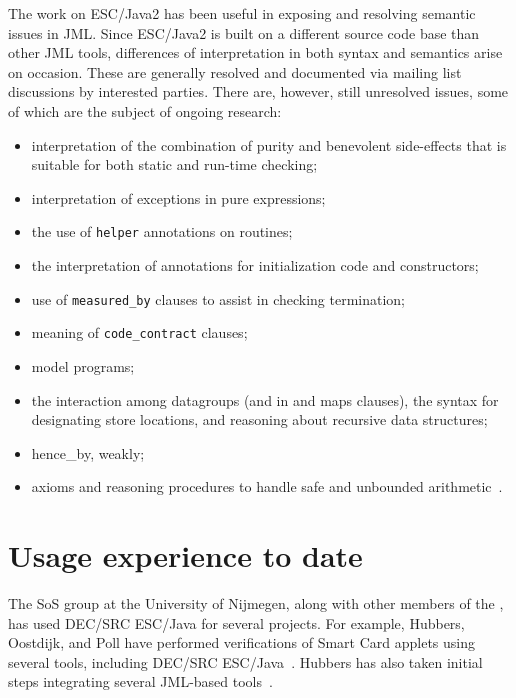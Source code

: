 \documentclass{acm_proc_article-sp}
\begin{document}
The work on ESC/Java2 has been useful in exposing and resolving
semantic issues in JML.  Since ESC/Java2 is built on a different
source code base than other JML tools, differences of interpretation
in both syntax and semantics arise on occasion.  These are generally
resolved and documented via mailing list discussions by interested
parties.  There are, however, still unresolved issues, some of which
are the subject of ongoing research:
\setlength{\partopsep}{0in}\setlength{\parskip}{0in}\setlength{\itemsep}{0in}\setlength{\topsep}{0in}
\begin{itemize}
\setlength{\partopsep}{0in}\setlength{\parskip}{0in}\setlength{\itemsep}{0in}\setlength{\topsep}{0in}
\item interpretation of the combination of purity and benevolent
  side-effects that is suitable for both static and run-time checking;
\item interpretation of exceptions in pure expressions;
\item the use of \texttt{helper} annotations on routines;
\item the interpretation of annotations for initialization code and
  constructors;
\item use of \texttt{measured\_by} clauses to assist in checking
  termination;
\item meaning of \texttt{code\_contract} clauses;
\item model programs;
\item the interaction among datagroups (and in and maps clauses), the syntax for designating store locations, and reasoning about recursive data structures;
\item hence\_by, weakly;
\item axioms and reasoning procedures to handle safe and unbounded
  arithmetic~\cite{Chalin03}.
\end{itemize}

\section{Usage experience to date}
The SoS group at the University of Nijmegen, along with other members
of the , has used DEC/SRC ESC/Java for several projects.  For
example, Hubbers, Oostdijk, and Poll have performed verifications of
Smart Card applets using several tools, including DEC/SRC
ESC/Java~\cite{HOP04}.  Hubbers has also taken initial steps
integrating several JML-based tools~\cite{Hub03}.
\end{document}
